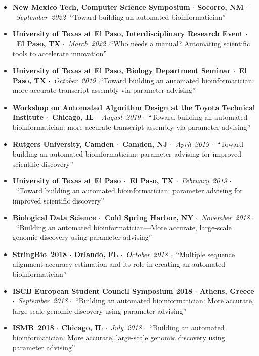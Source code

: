 \documentclass[10pt,letterpaper]{article}
\newcommand{\bigdot}{$\cdot$\xspace}
\begin{document}
\begin{itemize}[leftmargin=*,labelindent=5pt,itemindent=-15pt]
  \item \textbf{New Mexico Tech, Computer Science Symposium \bigdot Socorro, NM} \bigdot~\textit{September~2022} \bigdot ``Toward building an automated bioinformatician''
  \item \textbf{University of Texas at El Paso, Interdisciplinary Research Event \bigdot~El Paso, TX} \bigdot~\textit{March~2022} \bigdot ``Who needs a manual? Automating scientific tools to accelerate innovation''
  \item \textbf{University of Texas at El Paso, Biology Department Seminar \bigdot~El Paso, TX} \bigdot~\textit{October~2019} \bigdot ``Toward building an automated bioinformatician: more accurate transcript assembly via parameter advising''
  \item \textbf{Workshop on Automated Algorithm Design at the Toyota Technical Institute \bigdot~Chicago, IL} \bigdot~\textit{August~2019} \bigdot~``Toward building an automated bioinformatician: more accurate transcript assembly via parameter advising''
  \item \textbf{Rutgers University, Camden \bigdot~Camden, NJ} \bigdot~\textit{April~2019} \bigdot~``Toward building an automated bioinformatician: 
parameter advising for improved scientific discovery''
  \item \textbf{University of Texas at El Paso \bigdot~El Paso, TX} \bigdot~\textit{February~2019} \bigdot~``Toward building an automated bioinformatician: 
parameter advising for improved scientific discovery''
  \item \textbf{Biological Data Science \bigdot~Cold Spring Harbor, NY} \bigdot~\textit{November~2018} \bigdot~``Building an automated bioinformatician---More accurate, large-scale genomic discovery using parameter advising'' 
   \item \textbf{StringBio~2018 \bigdot Orlando, FL} \bigdot~\textit{October~2018} \bigdot~``Multiple sequence alignment accuracy estimation and its role in creating an automated bioinformatician'' 
   \item \textbf{ISCB European Student Council Symposium 2018 \bigdot Athens, Greece} \bigdot~\textit{September~2018} \bigdot~``Building an automated bioinformatician: More accurate, large-scale genomic discovery using parameter advising''
    \item \textbf{ISMB~2018 \bigdot Chicago, IL} \bigdot~\textit{July~2018} \bigdot~``Building an automated bioinformatician: More accurate, large-scale genomic discovery using parameter advising''

\end{itemize}
\end{document}

